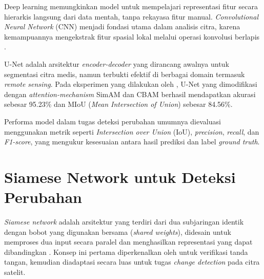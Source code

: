 Deep learning memungkinkan model untuk mempelajari representasi fitur secara hierarkis langsung dari data mentah, tanpa rekayasa fitur manual. \textit{Convolutional Neural Network} (CNN) menjadi fondasi utama dalam analisis citra, karena kemampuannya mengekstrak fitur spasial lokal melalui operasi konvolusi berlapis \cite{purworno2023cnn}.

U-Net \citep{DBLP:journals/corr/RonnebergerFB15} adalah arsitektur \textit{encoder-decoder} yang dirancang awalnya untuk segmentasi citra medis, namun terbukti efektif di berbagai domain termasuk \textit{remote sensing}. Pada eksperimen yang dilakukan oleh \cite{yang2024researchimprovedunetbased}, U-Net yang dimodifikasi dengan \textit{attention-mechanism} SimAM dan CBAM berhasil mendapatkan akurasi sebesar 95.23\% dan MIoU (\textit{Mean Intersection of Union}) sebesar 84.56\%. 

Performa model dalam tugas deteksi perubahan umumnya dievaluasi menggunakan metrik seperti \textit{Intersection over Union} (IoU), \textit{precision}, \textit{recall}, dan \textit{F1-score}, yang mengukur kesesuaian antara hasil prediksi dan label \textit{ground truth}.

\section{Siamese Network untuk Deteksi Perubahan}






\textit{Siamese network} adalah arsitektur yang terdiri dari dua subjaringan identik dengan bobot yang digunakan bersama (\textit{shared weights}), didesain untuk memproses dua input secara paralel dan menghasilkan representasi yang dapat dibandingkan \citep{DBLP:journals/corr/abs-2011-10566}. Konsep ini pertama diperkenalkan oleh \cite{NIPS1993_288cc0ff} untuk verifikasi tanda tangan, kemudian diadaptasi secara luas untuk tugas \textit{change detection} pada citra satelit. 


